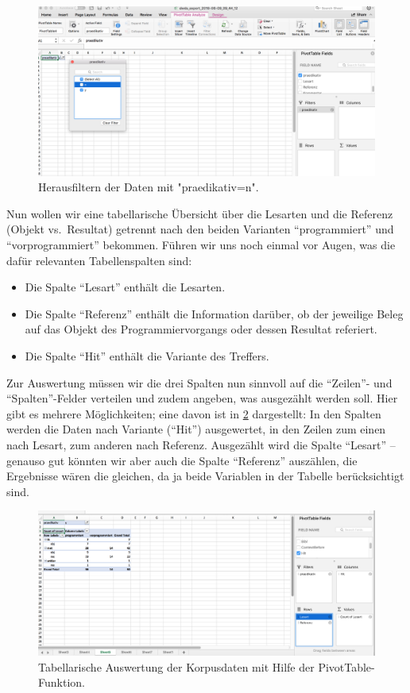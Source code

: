 \documentclass[]{article}
\providecommand{\tightlist}{%
  \setlength{\itemsep}{0pt}\setlength{\parskip}{0pt}}
\begin{document}
\begin{figure}
\includegraphics[width=6.28in]{docs/fig/praedikativ_filter} \caption{Herausfiltern der Daten mit "praedikativ=n".}\label{fig:praedikativfilter}
\end{figure}

Nun wollen wir eine tabellarische Übersicht über die Lesarten und die
Referenz (Objekt vs.~Resultat) getrennt nach den beiden Varianten
\enquote{programmiert} und \enquote{vorprogrammiert} bekommen. Führen
wir uns noch einmal vor Augen, was die dafür relevanten Tabellenspalten
sind:

\begin{itemize}
\tightlist
\item
  Die Spalte \enquote{Lesart} enthält die Lesarten.
\item
  Die Spalte \enquote{Referenz} enthält die Information darüber, ob der
  jeweilige Beleg auf das Objekt des Programmiervorgangs oder dessen
  Resultat referiert.
\item
  Die Spalte \enquote{Hit} enthält die Variante des Treffers.
\end{itemize}

Zur Auswertung müssen wir die drei Spalten nun sinnvoll auf die
\enquote{Zeilen}- und \enquote{Spalten}-Felder verteilen und zudem
angeben, was ausgezählt werden soll. Hier gibt es mehrere Möglichkeiten;
eine davon ist in \ref{fig:excelfilter} dargestellt: In den Spalten
werden die Daten nach Variante (\enquote{Hit}) ausgewertet, in den
Zeilen zum einen nach Lesart, zum anderen nach Referenz. Ausgezählt wird
die Spalte \enquote{Lesart} -- genauso gut könnten wir aber auch die
Spalte \enquote{Referenz} auszählen, die Ergebnisse wären die gleichen,
da ja beide Variablen in der Tabelle berücksichtigt sind.

\begin{figure}
\includegraphics[width=6.36in]{docs/fig/excel_allfilters} \caption{Tabellarische Auswertung der Korpusdaten mit Hilfe der PivotTable-Funktion.}\label{fig:excelfilter}
\end{figure}
\end{document}
